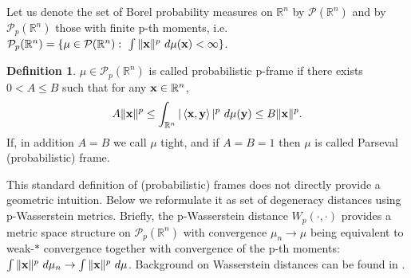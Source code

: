 \documentclass{amsart}
\numberwithin{equation}{section}
\newcommand\cP{{\mathcal P}}
\newcommand\R{{\mathbb R}}
\theoremstyle{plain}
\theoremstyle{definition}
\newtheorem{definition}[subsection]{Definition}
\begin{document}
Let us denote the set of Borel probability measures on $\R^n$ by $\cP(\R^n)$ and by $\cP_p(\R^n)$ those with finite p-th moments, i.e. $\cP_p(\R^n)=\{\mu \in \cP(\R^n):\ \int \|{\bf x}\|^p\ d \mu({\bf x})<\infty\}$.  
\begin{definition}
    $\mu \in  \mathcal{P}_p(\mathbb{R}^n)$ is called probabilistic p-frame if there exists  $0<A \leq B $ such that for any ${\bf x} \in \mathbb{R}^n$, 
\begin{equation*}
    A \Vert {\bf x}  \Vert^p \leq\int_{\mathbb{R}^n} | \left\langle {\bf x}, {\bf y} \right\rangle |^p\ d\mu({\bf y})  \leq B\Vert {\bf x}  \Vert^p. 
\end{equation*}
If, in addition $A = B$ we call $\mu$ tight, and if $A = B=1$ then $\mu$ is called Parseval (probabilistic) frame. 
\end{definition}
This standard definition of (probabilistic) frames does not directly provide a geometric intuition. Below we reformulate it as set of degeneracy distances using p-Wasserstein metrics. Briefly, the p-Wasserstein distance $W_p(\cdot, \cdot)$ provides a metric space structure on $\cP_p(\R^n)$ with convergence $\mu_n \rightarrow \mu$ being equivalent to weak-$\ast$ convergence together with convergence of the p-th moments: $\int \|{\bf x}\|^p\ d \mu_n \rightarrow \int \|{\bf x}\|^p\ d \mu$. Background on Wasserstein distances can be found in \cite{figalli-glaudo, villanitopics, villani2009optimal}.
\end{document}
